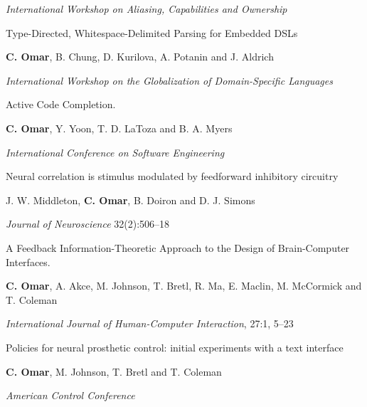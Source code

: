 \documentclass[10pt,letterpaper]{article}
\renewenvironment{itemize}{
  \begin{list}{}{
    \setlength{\leftmargin}{1.25em}
    \setlength{\itemsep}{0.25em}
    \setlength{\parskip}{0pt}
    \setlength{\parsep}{0.2em}
  }
}{
  \end{list}
}
\begin{document}
\begin{enumerate}[leftmargin=*, labelindent=6.5em, font=\bfseries]
\begin{itemize}
          \item \textit{International Workshop on Aliasing, Capabilities and Ownership}
        \end{itemize}
  \item[GlobalDSL 2013] Type-Directed, Whitespace-Delimited Parsing for Embedded DSLs
        \begin{itemize}
          \item \textbf{C. Omar}, B. Chung, D. Kurilova, A. Potanin and J. Aldrich
          \item \textit{International Workshop on the Globalization of Domain-Specific Languages}
        \end{itemize}
  \item[ICSE 2012] {Active Code Completion}.
        \begin{itemize}
          \item \textbf{C. Omar}, Y. Yoon, T. D. LaToza and B. A. Myers
          \item \textit{International Conference on Software Engineering}
        \end{itemize}
  \item[J. Neuro. 2012] {Neural correlation is stimulus modulated by feedforward inhibitory circuitry}
        \begin{itemize}
          \item J. W. Middleton, \textbf{C. Omar}, B. Doiron and D. J. Simons
          \item \textit{Journal of Neuroscience} 32(2):506--18
        \end{itemize}
  \item[IJHCI 2011] A Feedback Information-Theoretic Approach to the Design of Brain-Computer Interfaces.
        \begin{itemize}
          \item  \textbf{C. Omar}, A. Akce, M. Johnson, T. Bretl, R. Ma, E. Maclin, M. McCormick and T. Coleman
          \item \textit{International Journal of Human-Computer Interaction}, 27:1, 5--23
        \end{itemize}
  \item[ACC 2008] Policies for neural prosthetic control: initial experiments with a text interface
        \begin{itemize}
          \item \textbf{C. Omar}, M. Johnson, T. Bretl and T. Coleman
          \item \textit{American Control Conference} 
        \end{itemize}

\end{enumerate}
\end{document}
